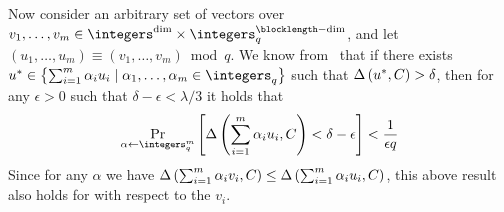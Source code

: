 \documentclass[11pt,letterpaper,usenames,dvipsnames]{article}
\begin{document}
Now consider an arbitrary set of vectors over $v_1,\dotsc,v_{m} \in \integers^{\dim} \times \integers_{q}^{\blocklength-\dim}$, and let $(u_1,\dotsc,u_m) \equiv (v_1,\dotsc,v_{m}) \bmod q$. We know from~\cite[Theorem 4.1]{BKS18} that if there exists $u^\ast \in \set{\sum_{i=1}^{m} \alpha_i u_i \mid \alpha_1,\dotsc,\alpha_m \in \integers_q}$ such that $\Delta\left(u^\ast,C\right) > \delta$, then for any $\epsilon > 0$ such that $\delta-\epsilon < \lambda/3$ it holds that
\[
\Pr_{\alpha \gets \integers_{q}^m} \left[\reldist{\sum_{i=1}^{m} \alpha_i u_i}{C} < \delta - \epsilon\right] < \frac{1}{\epsilon q}
\]
Since for any $\alpha$ we have $\Delta\left(\sum_{i=1}^{m} \alpha_i v_i,C\right) \leq \Delta\left(\sum_{i=1}^{m} \alpha_i u_i,C\right)$, this above result also holds for with respect to the $v_i$.



\end{document}
